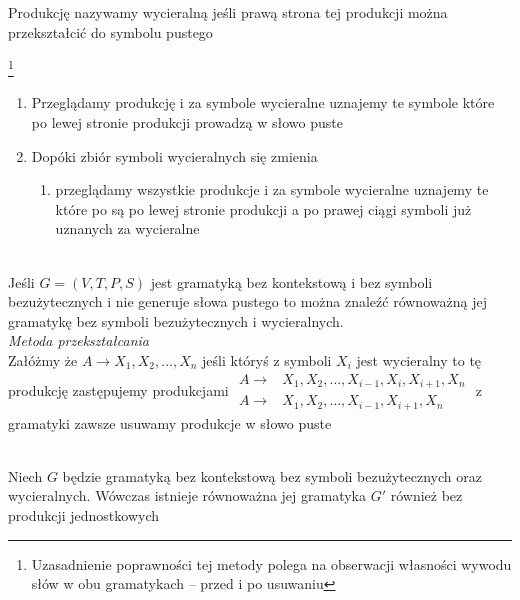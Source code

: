 	\begin{df}
		Produkcję nazywamy wycieralną jeśli prawą strona tej produkcji można przekształcić do symbolu pustego
	\end{df}			
	
	\begin{alg}\footnote{Uzasadnienie poprawności tej metody polega na 
	obserwacji własności wywodu słów w obu gramatykach -- przed i po usuwaniu}~\\
		\begin{enumerate}
			\item Przeglądamy produkcję i za symbole wycieralne uznajemy te symbole które po lewej stronie produkcji 
			prowadzą w słowo puste
			\item Dopóki zbiór symboli wycieralnych się zmienia
			\begin{enumerate}
				\item przeglądamy wszystkie produkcje i za symbole wycieralne uznajemy te które po są po lewej stronie
				produkcji a po prawej ciągi symboli już uznanych za wycieralne
			\end{enumerate}
		\end{enumerate}
	\end{alg}
	
	\begin{df}~\\
		Jeśli $G = (V, T, P, S)$ jest gramatyką bez kontekstową i bez symboli bezużytecznych i nie generuje słowa pustego
		to można znaleźć równoważną jej gramatykę bez symboli bezużytecznych i wycieralnych.\\
		\emph{Metoda przekształcania}\\
		Załóżmy że $A \to X_1,X_2,\dots,X_n$ jeśli któryś z symboli $X_i$ jest wycieralny to tę produkcję zastępujemy produkcjami
		$\begin{matrix}
			A \to& X_1,X_2,\dots,X_{i-1},X_i,X_{i+1},X_n \\ A \to& X_1,X_2,\dots,X_{i-1},X_{i+1},X_n
		\end{matrix}$
		z gramatyki zawsze usuwamy produkcje w słowo puste
	\end{df}	
	
	\begin{lemat}~\\
		Niech $G$ będzie gramatyką bez kontekstową bez symboli bezużytecznych oraz wycieralnych. Wówczas 
		istnieje równoważna jej gramatyka $G'$ również bez produkcji jednostkowych
	\end{lemat}
	
